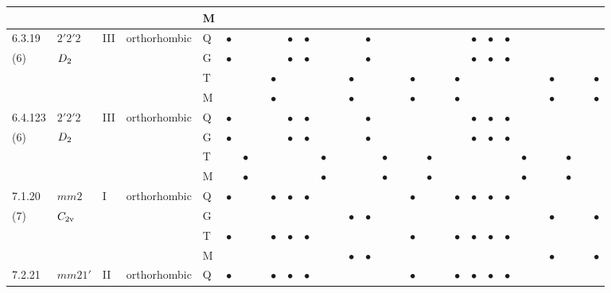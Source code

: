 \documentclass[fleqn,9pt,landscape]{jsarticle}
\begin{document}
\begin{longtable}{lllll|l|lll|ll|lll|l|lll|lll|l|ll|lll|lll}
 &  &  &  & M &  &  &  &  &  &  &  &  &  &  &  &  &  &  &  &  &  &  &  &  &  &  &  &  &  \\ \hline
6.3.19 & \texttt{$2'2'2$} & III & orthorhombic & Q & $\bullet$ &  &  &  & $\bullet$ & $\bullet$ &  &  &  & $\bullet$ &  &  &  &  &  &  & $\bullet$ & $\bullet$ & $\bullet$ &  &  &  &  &  &  \\
(6) & $D_{\rm 2}$ &  &  & G & $\bullet$ &  &  &  & $\bullet$ & $\bullet$ &  &  &  & $\bullet$ &  &  &  &  &  &  & $\bullet$ & $\bullet$ & $\bullet$ &  &  &  &  &  &  \\
 &  &  &  & T &  &  &  & $\bullet$ &  &  &  &  & $\bullet$ &  &  &  & $\bullet$ &  &  & $\bullet$ &  &  &  &  &  & $\bullet$ &  &  & $\bullet$ \\
 &  &  &  & M &  &  &  & $\bullet$ &  &  &  &  & $\bullet$ &  &  &  & $\bullet$ &  &  & $\bullet$ &  &  &  &  &  & $\bullet$ &  &  & $\bullet$ \\ \hline
6.4.123 & \texttt{$2'2'2$} & III & orthorhombic & Q & $\bullet$ &  &  &  & $\bullet$ & $\bullet$ &  &  &  & $\bullet$ &  &  &  &  &  &  & $\bullet$ & $\bullet$ & $\bullet$ &  &  &  &  &  &  \\
(6) & $D_{\rm 2}$ &  &  & G & $\bullet$ &  &  &  & $\bullet$ & $\bullet$ &  &  &  & $\bullet$ &  &  &  &  &  &  & $\bullet$ & $\bullet$ & $\bullet$ &  &  &  &  &  &  \\
 &  &  &  & T &  & $\bullet$ &  &  &  &  & $\bullet$ &  &  &  & $\bullet$ &  &  & $\bullet$ &  &  &  &  &  & $\bullet$ &  &  & $\bullet$ &  &  \\
 &  &  &  & M &  & $\bullet$ &  &  &  &  & $\bullet$ &  &  &  & $\bullet$ &  &  & $\bullet$ &  &  &  &  &  & $\bullet$ &  &  & $\bullet$ &  &  \\ \hline
7.1.20 & \texttt{$mm2$} & I & orthorhombic & Q & $\bullet$ &  &  & $\bullet$ & $\bullet$ & $\bullet$ &  &  &  &  &  &  & $\bullet$ &  &  & $\bullet$ & $\bullet$ & $\bullet$ & $\bullet$ &  &  &  &  &  &  \\
(7) & $C_{\rm 2v}$ &  &  & G &  &  &  &  &  &  &  &  & $\bullet$ & $\bullet$ &  &  &  &  &  &  &  &  &  &  &  & $\bullet$ &  &  & $\bullet$ \\
 &  &  &  & T & $\bullet$ &  &  & $\bullet$ & $\bullet$ & $\bullet$ &  &  &  &  &  &  & $\bullet$ &  &  & $\bullet$ & $\bullet$ & $\bullet$ & $\bullet$ &  &  &  &  &  &  \\
 &  &  &  & M &  &  &  &  &  &  &  &  & $\bullet$ & $\bullet$ &  &  &  &  &  &  &  &  &  &  &  & $\bullet$ &  &  & $\bullet$ \\ \hline
7.2.21 & \texttt{$mm21'$} & II & orthorhombic & Q & $\bullet$ &  &  & $\bullet$ & $\bullet$ & $\bullet$ &  &  &  &  &  &  & $\bullet$ &  &  & $\bullet$ & $\bullet$ & $\bullet$ & $\bullet$ &  &  &  &  &  &  \\

\end{longtable}
\end{document}

